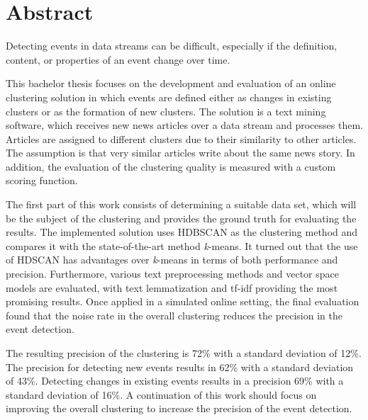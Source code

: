 \section*{Abstract}

Detecting events in data streams can be difficult,
especially if the definition, content, or properties of an event change over time.

This bachelor thesis focuses on the development and evaluation of an online clustering solution
in which events are defined either as changes in existing clusters or as the formation of new clusters.
The solution is a text mining software, which receives new news articles over a data stream and processes them.
Articles are assigned to different clusters due to their similarity to other articles.
The assumption is that very similar articles write about the same news story.
In addition, the evaluation of the clustering quality is measured with a custom scoring function.

The first part of this work consists of determining a suitable data set,
which will be the subject of the clustering and provides the ground truth for evaluating the results.
The implemented solution uses HDBSCAN as the clustering method
and compares it with the state-of-the-art method \textit{k}-means.
It turned out that the use of HDSCAN has advantages over \textit{k}-means in terms of both performance and precision.
Furthermore, various text preprocessing methods and vector space models are evaluated,
with text lemmatization and tf-idf providing the most promising results.
Once applied in a simulated online setting,
the final evaluation found that the noise rate in the overall clustering reduces the precision in the event detection.

The resulting precision of the clustering is 72\% with a standard deviation of 12\%.
The precision for detecting new events results in 62\% with a standard deviation of 43\%.
Detecting changes in existing events results in a precision 69\% with a standard deviation of 16\%.
A continuation of this work should focus on improving the overall clustering to increase the precision of the event detection.
